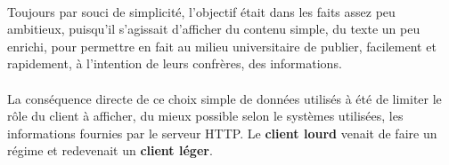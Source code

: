 {  %

  \paragraph{} Toujours par souci de simplicité, l'objectif était dans les faits assez peu ambitieux,
  puisqu'il s'agissait d'afficher du contenu simple, du texte un peu enrichi, pour permettre en fait
  au milieu universitaire de publier, facilement et rapidement,  à l'intention de leurs confrères,
  des informations.

  \paragraph{} La conséquence directe de ce choix simple de données utilisés à été de limiter le
  rôle du client à afficher, du mieux possible selon le systèmes utilisées, les informations
  fournies par le serveur HTTP. Le \textbf{client lourd} venait de faire un régime et redevenait un
  \textbf{client léger}.

}



